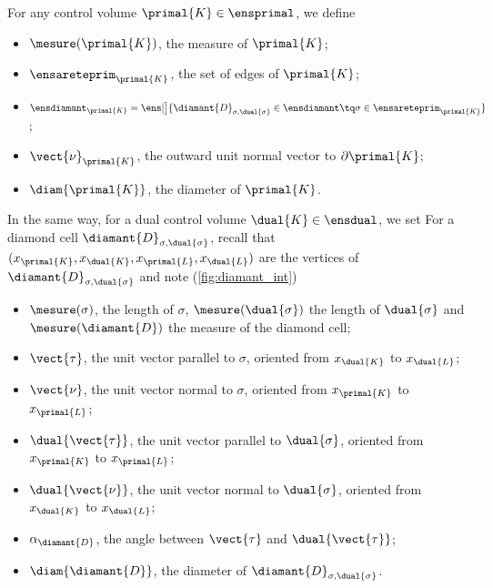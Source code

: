 \noindent For any control volume $\primal{K} \in \ensprimal$, we define
\begin{itemize}
    \item $\mesure(\primal{K})$, the measure of $\primal{K}$;
    \item $\ensareteprim_{\primal{K}}$, the set of edges of $\primal{K}$;
    \item $\ensdiamant_{\primal{K}} = \ens[\big]{\diamant{D}_{\sigma, \dual{\sigma}} \in \ensdiamant \tq \sigma \in \ensareteprim_{\primal{K}}}$;
    \item $\vect{\nu}_{\primal{K}}$, the outward unit normal vector to $\partial \primal{K}$;
    \item $\diam{\primal{K}}$, the diameter of $\primal{K}$.
\end{itemize}
In the same way, for a dual control volume $\dual{K} \in \ensdual$, we set
\noindent For a diamond cell $\diamant{D}_{\sigma, \dual{\sigma}}$, recall that $(x_{\primal{K}}, x_{\dual{K}}, x_{\primal{L}}, x_{\dual{L}})$ are the vertices of $\diamant{D}_{\sigma, \dual{\sigma}}$ and note (\ref{fig:diamant_int})
\begin{itemize}
    \item $\mesure(\sigma)$, the length of $\sigma$, $\mesure(\dual{\sigma})$ the length of $\dual{\sigma}$ and $\mesure(\diamant{D})$ the measure of the diamond cell;
    \item $\vect{\tau}$, the unit vector parallel to $\sigma$, oriented from $x_{\dual{K}}$ to $x_{\dual{L}}$;
    \item $\vect{\nu}$, the unit vector normal to $\sigma$, oriented from $x_{\primal{K}}$ to $x_{\primal{L}}$;
    \item $\dual{\vect{\tau}}$, the unit vector parallel to $\dual{\sigma}$, oriented from $x_{\primal{K}}$ to $x_{\primal{L}}$;
    \item $\dual{\vect{\nu}}$, the unit vector normal to $\dual{\sigma}$, oriented from $x_{\dual{K}}$ to $x_{\dual{L}}$;
    \item $\alpha_{\diamant{D}}$, the angle between $\vect{\tau}$ and $\dual{\vect{\tau}}$;
    \item $\diam{\diamant{D}}$, the diameter of $\diamant{D}_{\sigma, \dual{\sigma}}$.
\end{itemize}
